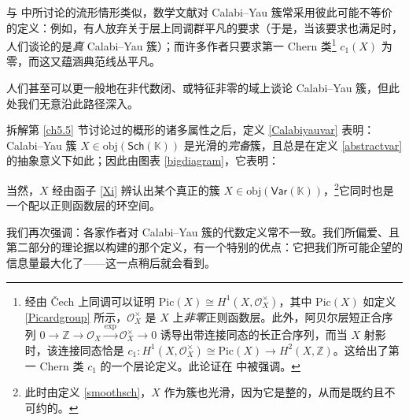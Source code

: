 \begin{Rem}
	与 \cite[注 7.7]{[Imp21]} 中所讨论的流形情形类似，数学文献对 Calabi--Yau 簇常采用彼此可能不等价的定义：例如，有人放弃关于层上同调群平凡的要求（于是，当该要求也满足时，人们谈论的是\textit{真} Calabi--Yau 簇）；而许多作者只要求第一 Chern 类\footnote{经由 Čech 上同调可以证明 $\text{Pic}(X)\cong H^1(X,\mathcal{O}_X^\times)$，其中 $\text{Pic}(X)$ 如定义 \ref{Picardgroup} 所示，$\mathcal{O}_X^\times$ 是 $X$ 上\textit{非零}正则函数层。此外，阿贝尔层短正合序列 $0\rightarrow\mathbb{Z}\rightarrow\mathcal{O}_X\xrightarrow{\text{exp}}\mathcal{O}_X^\times\rightarrow 0$ 诱导出带连接同态的长正合序列，而当 $X$ 射影时，该连接同态恰是 $c_1:H^1(X,\mathcal{O}_X^\times)\cong\text{Pic}(X)\rightarrow H^2(X,\mathbb{Z})$。这给出了第一 Chern 类 $c_1$ 的一个层论定义。此论证在 \cite[第 4.5.1 节]{[ABC+09]} 中被强调。} $c_1(X)$ 为零，而这又蕴涵典范线丛平凡。

	人们甚至可以更一般地在非代数闭、或特征非零的域上谈论 Calabi--Yau 簇，但此处我们无意沿此路径深入。
\end{Rem}


拆解第 \ref{ch5.5} 节讨论过的概形的诸多属性之后，定义 \ref{Calabiyauvar} 表明：Calabi--Yau 簇 $X\in\text{obj}(\mathsf{Sch}(\mathbb{K}))$ 是光滑的\textit{完备}簇，且总是在定义 \ref{abstractvar} 的抽象意义下如此；因此由图表 \eqref{bigdiagram}，它表明：
\vspace*{0.3cm}

\vspace*{0.3cm}

当然，$X$ 经由函子 \eqref{Xi} 辨认出某个真正的簇 $X\in\text{obj}(\mathsf{Var}(\mathbb{K}))$，\footnote{此时由定义 \ref{smoothsch}，$X$ 作为簇也光滑，因为它是整的，从而是既约且不可约的。}它同时也是一个配以正则函数层的环空间。

我们再次强调：各家作者对 Calabi--Yau 簇的代数定义常不一致。我们所偏爱、且第二部分的理论据以构建的那个定义，有一个特别的优点：它把我们所可能企望的信息量最大化了——这一点稍后就会看到。

